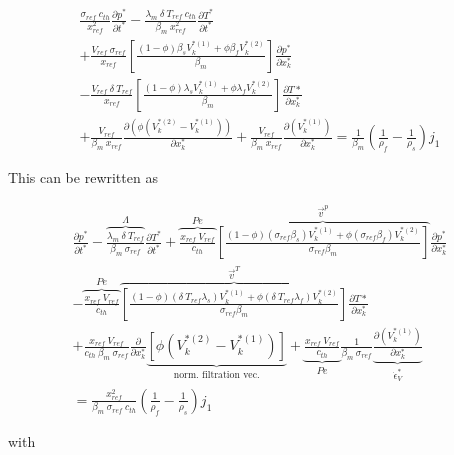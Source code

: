 \documentclass[]{scrreprt}
\begin{document}
\begin{multline}
  \label{eq:mixture_mass_balance4}
  \frac{\sigma_{ref} \: c_{th}}{x^2_{ref}} \frac{\partial p^*}{\partial t^*} 
  - \frac{\lambda_m \: \delta \: T_{ref} \: c_{th}}{\beta_m\:x^2_{ref}} \frac{\partial T^*}{\partial t^*} \\
  + \frac{V_{ref} \: \sigma_{ref}}{x_{ref}}\left[\frac{(1-\phi)\beta_s V^{*(1)}_k + \phi\beta_f V^{*(2)}_k}{\beta_m} \right] \frac{\partial p^*}{\partial x^*_k} \\
  - \frac{V_{ref}\:\delta\:T_{ref}}{x_{ref}}\left[\frac{(1-\phi)\lambda_s V^{*(1)}_k + \phi\lambda_f V^{*(2)}_k}{\beta_m} \right] \frac{\partial T*}{\partial x^*_k} \\
  + \frac{V_{ref}}{\beta_m\:x_{ref}} \frac{\partial( \phi (V^{*(2)}_k -V^{*(1)}_k))}{\partial x^*_k}
  + \frac{V_{ref}}{\beta_m\:x_{ref}} \frac{\partial(V^{*(1)}_k)}{\partial x^*_k}  
  = \frac{1}{\beta_m} \left(\frac{1}{\rho_f} - \frac{1}{\rho_s}\right)j_1
\end{multline}

This can be rewritten as

\begin{multline}
  \label{eq:mixture_mass_balance5}
  \frac{\partial p^*}{\partial t^*} 
  - \overbrace{\frac{\lambda_m \: \delta \: T_{ref}}{\beta_m\:\sigma_{ref}}}^{\Lambda} \frac{\partial T^*}{\partial t^*} 
  + \overbrace{\frac{x_{ref}\:V_{ref}}{c_{th}}}^{Pe}  \overbrace{\left[\frac{(1-\phi)(\sigma_{ref}\beta_s) V^{*(1)}_k + \phi(\sigma_{ref}\beta_f) V^{*(2)}_k}{\sigma_{ref}\beta_m} \right]}^{\vec{v}^p} \frac{\partial p^*}{\partial x^*_k} \\
  - \overbrace{\frac{x_{ref}\:V_{ref}}{c_{th}}}^{Pe} \overbrace{\left[\frac{(1-\phi)(\delta\:T_{ref}\lambda_s) V^{*(1)}_k + \phi(\delta\:T_{ref}\lambda_f) V^{*(2)}_k}{\sigma_{ref}\beta_m} \right]}^{\vec{v}^T} \frac{\partial T*}{\partial x^*_k} \\
  + \frac{x_{ref}\:V_{ref}}{c_{th}\:\beta_m\:\sigma_{ref}}  \frac{\partial}{\partial x^*_k} \underbrace{\left[ \phi (V^{*(2)}_k -V^{*(1)}_k)\right]}_{\text{norm. filtration vec.}} 
  + \underbrace{\frac{x_{ref}\:V_{ref}}{c_{th}}}_{Pe} \frac{1}{\beta_m\:\sigma_{ref}} \underbrace{\frac{\partial(V^{*(1)}_k)}{\partial x^*_k}}_{\dot{\epsilon}^*_V}  \\
  = \frac{x^2_{ref}}{\beta_m\:\sigma_{ref}\:c_{th}} \left(\frac{1}{\rho_f} - \frac{1}{\rho_s}\right)j_1
\end{multline}

with
\end{document}
